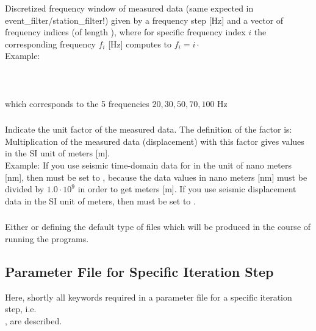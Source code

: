 \subsubsection{} 
\label{files,sec:main_parfile,itm:mdata_freq}
Discretized frequency window of measured data (same expected in event\_filter/station\_filter!) given by a frequency 
step  [Hz] and a vector of frequency indices 
(of length ), where for specific frequency index $i$ the corresponding frequency $f_i$ [Hz] 
computes to $f_i = i \cdot$ \\
Example:\\
\\
\\
\\
which corresponds to the 5 frequencies $20,30,50,70,100$ Hz
\subsubsection{} 
Indicate the unit factor of the measured data. The definition of the factor is:\\
Multiplication of the measured data (displacement) with this factor gives values in the SI unit of meters [m].\\
Example: If you use seismic time-domain data for \ASKI{} in the unit of nano meters [nm], then 
must be set to  , because the data values in nano meters [nm] must be divided by $1.0\cdot 10^9$ in order to get meters [m].
If you use seismic displacement data in the SI unit of meters, then  must be set to .
\subsubsection{} 
Either  or  defining the default type of  files 
which will be produced in the course of running the programs.
%
\subsection{Parameter File for Specific Iteration Step} \label{files,sec:iter_parfile}
%
Here, shortly all keywords required in a parameter file for a specific iteration step, i.e.\ \\
 , are described.

